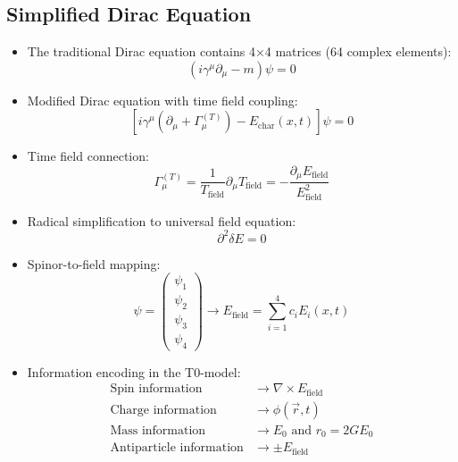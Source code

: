 \documentclass[12pt,a4paper]{article}
\begin{document}
	\subsection{Simplified Dirac Equation}
	\begin{itemize}
		\item The traditional Dirac equation contains 4×4 matrices (64 complex elements):
		$$\left(i\gamma^\mu \partial_\mu - m\right) \psi = 0$$
		
		\item Modified Dirac equation with time field coupling:
		$$\boxed{\left[i\gamma^\mu\left(\partial_\mu + \Gamma_\mu^{(T)}\right) - E_{\text{char}}(x,t)\right]\psi = 0}$$
		
		\item Time field connection:
		$$\Gamma_\mu^{(T)} = \frac{1}{T_{\text{field}}} \partial_\mu T_{\text{field}} = -\frac{\partial_\mu E_{\text{field}}}{E_{\text{field}}^2}$$
		
		\item Radical simplification to universal field equation:
		$$\boxed{\partial^2 \delta E = 0}$$
		
		\item Spinor-to-field mapping:
		$$\psi = \begin{pmatrix} \psi_1 \\ \psi_2 \\ \psi_3 \\ \psi_4 \end{pmatrix} \rightarrow E_{\text{field}} = \sum_{i=1}^4 c_i E_i(x,t)$$
		
		\item Information encoding in the T0-model:
		\begin{align*}
			\text{Spin information} &\rightarrow \nabla \times E_{\text{field}}\\
			\text{Charge information} &\rightarrow \phi(\vec{r}, t)\\
			\text{Mass information} &\rightarrow E_0 \text{ and } r_0 = 2GE_0\\
			\text{Antiparticle information} &\rightarrow \pm E_{\text{field}}
		\end{align*}
	\end{itemize}
	
\end{document}
